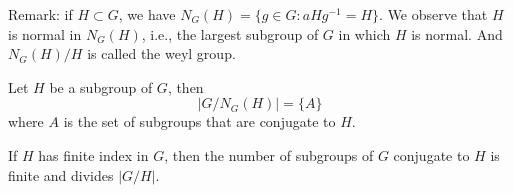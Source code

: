 Remark: if $H\subset G$, we have $N_G(H)=\{g\in G: aHg^{-1}=H\}$. We observe that $H$ is normal in $N_G(H)$, i.e., the largest subgroup of $G$ in which $H$ is normal. And $N_G(H)/H$ is called the weyl group.
\begin{lem}
    Let $H$ be a subgroup of $G$, then 
    \begin{equation*}
        |G/N_G(H)|=\{A\}
    \end{equation*}
    where $A$ is the set of subgroups that are conjugate to $H$.
\end{lem}
\begin{cor}
    If $H$ has finite index in $G$, then the number of subgroups of $G$ conjugate to $H$ is finite and divides $|G/H|$.
\end{cor}